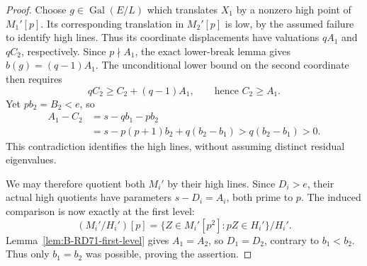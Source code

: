 \begin{proof}
Choose \(g\in\operatorname{Gal}(E/L)\) which translates \(X_1\)
by a nonzero high point of \(M_1'[p]\).
Its corresponding translation in \(M_2'[p]\) is low, by
the assumed failure to identify high lines.
Thus its coordinate displacements have valuations
\(qA_1\) and \(qC_2\), respectively.
Since \(p\nmid A_1\), the exact lower-break lemma gives
\(b(g)=(q-1)A_1\).
The unconditional lower bound on the second coordinate
then requires
\[
 qC_2\ge C_2+(q-1)A_1,\qquad\text{hence }C_2\ge A_1.
 \tag{B-RD71.8}
\]
Yet \(pb_2=B_2<e\), so
\[
 \begin{aligned}
 A_1-C_2
   &=s-qb_1-pb_2\\
   &=s-p(p+1)b_2+q(b_2-b_1)
     >q(b_2-b_1)>0.
 \end{aligned}
 \tag{B-RD71.9}
\]
This contradiction identifies the high lines, without
assuming distinct residual eigenvalues.

We may therefore quotient both \(M_i'\) by their high lines.
Since \(D_i>e\), their actual high quotients have parameters
\(s-D_i=A_i\), both prime to \(p\).
The induced comparison is now exactly at the first level:
\[
 (M_i'/H_i')[p]
   =\{Z\in M_i'[p^2]:pZ\in H_i'\}/H_i'.
 \tag{B-RD71.10}
\]
Lemma~\ref{lem:B-RD71-first-level} gives \(A_1=A_2\),
so \(D_1=D_2\), contrary to \(b_1<b_2\).
Thus only \(b_1=b_2\) was possible, proving the assertion.
\end{proof}

